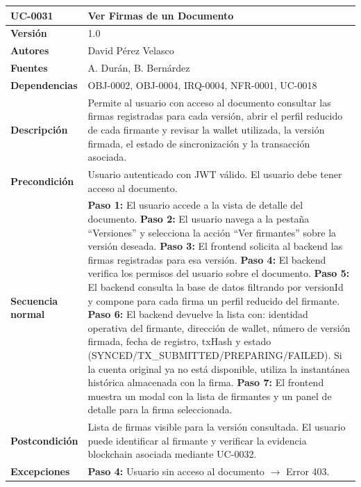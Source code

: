 \documentclass[11pt, a4paper]{article}
\begin{document}
\begin{longtable}{|p{4cm}|p{10cm}|}
\hline
\textbf{UC-0031} & Ver Firmas de un Documento \\
\hline
\textbf{Versión} & 1.0 \\
\hline
\textbf{Autores} & David Pérez Velasco \\
\hline
\textbf{Fuentes} & A. Durán, B. Bernárdez \\
\hline
\textbf{Dependencias} & OBJ-0002, OBJ-0004, IRQ-0004, NFR-0001, UC-0018 \\
\hline
\textbf{Descripción} & Permite al usuario con acceso al documento consultar las firmas registradas para cada versión, abrir el perfil reducido de cada firmante y revisar la wallet utilizada, la versión firmada, el estado de sincronización y la transacción asociada. \\
\hline
\textbf{Precondición} & Usuario autenticado con JWT válido. El usuario debe tener acceso al documento. \\
\hline
\textbf{Secuencia normal} &
\textbf{Paso 1:} El usuario accede a la vista de detalle del documento.\newline
\textbf{Paso 2:} El usuario navega a la pestaña ``Versiones'' y selecciona la acción ``Ver firmantes'' sobre la versión deseada.\newline
\textbf{Paso 3:} El frontend solicita al backend las firmas registradas para esa versión.\newline
\textbf{Paso 4:} El backend verifica los permisos del usuario sobre el documento.\newline
\textbf{Paso 5:} El backend consulta la base de datos filtrando por versionId y compone para cada firma un perfil reducido del firmante.\newline
\textbf{Paso 6:} El backend devuelve la lista con: identidad operativa del firmante, dirección de wallet, número de versión firmada, fecha de registro, txHash y estado (SYNCED/TX\_SUBMITTED/PREPARING/FAILED). Si la cuenta original ya no está disponible, utiliza la instantánea histórica almacenada con la firma.\newline
\textbf{Paso 7:} El frontend muestra un modal con la lista de firmantes y un panel de detalle para la firma seleccionada.\\
\hline
\textbf{Postcondición} & Lista de firmas visible para la versión consultada. El usuario puede identificar al firmante y verificar la evidencia blockchain asociada mediante UC-0032. \\
\hline
\textbf{Excepciones} &
\textbf{Paso 4:} Usuario sin acceso al documento $\rightarrow$ Error 403.\newline

\end{longtable}
\end{document}
